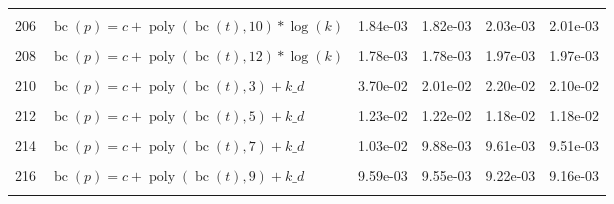 \documentclass[12pt,a4paper]{article}
\DeclareMathOperator{\bc}{bc}
\DeclareMathOperator{\poly}{poly}
\begin{document}
\begin{longtable}[t]{ll>{\raggedleft\arraybackslash}p{2cm}>{\raggedleft\arraybackslash}p{2cm}>{\raggedleft\arraybackslash}p{2cm}>{\raggedleft\arraybackslash}p{2cm}}
\cellcolor{gray!6}{205} & \cellcolor{gray!6}{$\bc(p) = c + \poly\left( \bc(t), 9 \right) * \log(k)$} & \cellcolor{gray!6}{2.35e-03} & \cellcolor{gray!6}{2.27e-03} & \cellcolor{gray!6}{2.58e-03} & \cellcolor{gray!6}{2.49e-03}\\
206 & $\bc(p) = c + \poly\left( \bc(t), 10 \right) * \log(k)$ & 1.84e-03 & 1.82e-03 & 2.03e-03 & 2.01e-03\\
\cellcolor{gray!6}{207} & \cellcolor{gray!6}{$\bc(p) = c + \poly\left( \bc(t), 11 \right) * \log(k)$} & \cellcolor{gray!6}{1.84e-03} & \cellcolor{gray!6}{1.82e-03} & \cellcolor{gray!6}{2.02e-03} & \cellcolor{gray!6}{2.00e-03}\\
208 & $\bc(p) = c + \poly\left( \bc(t), 12 \right) * \log(k)$ & 1.78e-03 & 1.78e-03 & 1.97e-03 & 1.97e-03\\
\cellcolor{gray!6}{209} & \cellcolor{gray!6}{$\bc(p) = c + \poly\left( \bc(t), 13 \right) * \log(k)$} & \cellcolor{gray!6}{1.77e-03} & \cellcolor{gray!6}{1.77e-03} & \cellcolor{gray!6}{1.96e-03} & \cellcolor{gray!6}{1.96e-03}\\
210 & $\bc(p) = c + \poly\left( \bc(t), 3 \right) + k\_d$ & 3.70e-02 & 2.01e-02 & 2.20e-02 & 2.10e-02\\
\cellcolor{gray!6}{211} & \cellcolor{gray!6}{$\bc(p) = c + \poly\left( \bc(t), 4 \right) + k\_d$} & \cellcolor{gray!6}{2.63e-02} & \cellcolor{gray!6}{2.28e-02} & \cellcolor{gray!6}{2.52e-02} & \cellcolor{gray!6}{2.42e-02}\\
212 & $\bc(p) = c + \poly\left( \bc(t), 5 \right) + k\_d$ & 1.23e-02 & 1.22e-02 & 1.18e-02 & 1.18e-02\\
\cellcolor{gray!6}{213} & \cellcolor{gray!6}{$\bc(p) = c + \poly\left( \bc(t), 6 \right) + k\_d$} & \cellcolor{gray!6}{1.19e-02} & \cellcolor{gray!6}{1.11e-02} & \cellcolor{gray!6}{1.20e-02} & \cellcolor{gray!6}{1.10e-02}\\
214 & $\bc(p) = c + \poly\left( \bc(t), 7 \right) + k\_d$ & 1.03e-02 & 9.88e-03 & 9.61e-03 & 9.51e-03\\
\cellcolor{gray!6}{215} & \cellcolor{gray!6}{$\bc(p) = c + \poly\left( \bc(t), 8 \right) + k\_d$} & \cellcolor{gray!6}{9.62e-03} & \cellcolor{gray!6}{9.57e-03} & \cellcolor{gray!6}{9.26e-03} & \cellcolor{gray!6}{9.19e-03}\\
216 & $\bc(p) = c + \poly\left( \bc(t), 9 \right) + k\_d$ & 9.59e-03 & 9.55e-03 & 9.22e-03 & 9.16e-03\\
\cellcolor{gray!6}{217} & \cellcolor{gray!6}{$\bc(p) = c + \poly\left( \bc(t), 10 \right) + k\_d$} & \cellcolor{gray!6}{9.46e-03} & \cellcolor{gray!6}{9.43e-03} & \cellcolor{gray!6}{9.05e-03} & \cellcolor{gray!6}{9.02e-03}\\

\end{longtable}
\end{document}
